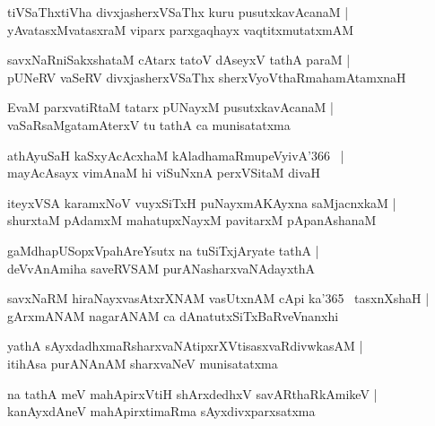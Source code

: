\documentclass[twoside,12pt,openright]{book}
\newcounter{shloka}[chapter]
\begin{document}
\begin{shloka}%
tiVSaThxtiVha divxjasherxVSaThx kuru pusutxkavAcanaM |\\
yAvatasxMvatasxraM viparx parxgaqhayx vaqtitxmutatxmAM
\end{shloka}

\begin{shloka}%
savxNaRniSakxshataM cAtarx tatoV dAseyxV tathA paraM |\\
pUNeRV vaSeRV divxjasherxVSaThx sherxVyoVthaRmahamAtamxnaH
\end{shloka}

\begin{shloka}%
EvaM parxvatiRtaM tatarx pUNayxM pusutxkavAcanaM |\\
vaSaRsaMgatamAterxV tu tathA ca munisatatxma
\end{shloka}

\begin{shloka}%
athAyuSaH kaSxyAcAcxhaM kAladhamaRmupeVyivA\char'366 ~|\\
mayAcAsayx vimAnaM hi viSuNxnA perxVSitaM divaH 
\end{shloka}

\begin{shloka}%
iteyxVSA karamxNoV vuyxSiTxH puNayxmAKAyxna saMjacnxkaM |\\
shurxtaM pAdamxM mahatupxNayxM pavitarxM pApanAshanaM
\end{shloka}

\begin{shloka}%
gaMdhapUSopxVpahAreYsutx na tuSiTxjAryate tathA |\\
deVvAnAmiha saveRVSAM purANasharxvaNAdayxthA
\end{shloka}

\begin{shloka}%
savxNaRM hiraNayxvasAtxrXNAM vasUtxnAM cApi ka\char'365 ~tasxnXshaH |\\
gArxmANAM nagarANAM  ca dAnatutxSiTxBaRveVnanxhi
\end{shloka}

\begin{shloka}%
yathA sAyxdadhxmaRsharxvaNAtipxrXVtisasxvaRdivwkasAM |\\
itihAsa purANAnAM sharxvaNeV munisatatxma
\end{shloka}

\begin{shloka}%
na tathA meV mahApirxVtiH shArxdedhxV savARthaRkAmikeV |\\
kanAyxdAneV mahApirxtimaRma sAyxdivxparxsatxma
\end{shloka}
\end{document}
